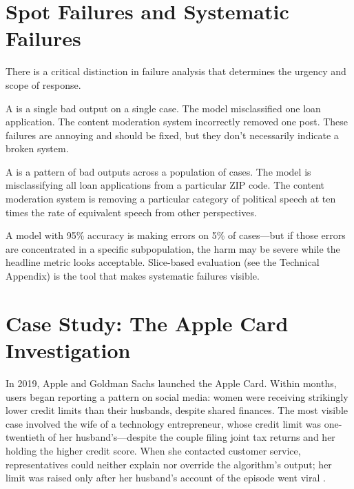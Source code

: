 \section{Spot Failures and Systematic Failures}
\label{sec:spot-vs-systematic}

There is a critical distinction in failure analysis that determines the urgency and scope of response.

A  is a single bad output on a single case. The model misclassified one loan application. The content moderation system incorrectly removed one post. These failures are annoying and should be fixed, but they don't necessarily indicate a broken system.

A  is a pattern of bad outputs across a population of cases. The model is misclassifying all loan applications from a particular ZIP code. The content moderation system is removing a particular category of political speech at ten times the rate of equivalent speech from other perspectives.

\begin{keyconcept}
A model with 95\% accuracy is making errors on 5\% of cases---but if those errors are concentrated in a specific subpopulation, the harm may be severe while the headline metric looks acceptable. Slice-based evaluation (see the Technical Appendix) is the tool that makes systematic failures visible.
\end{keyconcept}

\section{Case Study: The Apple Card Investigation}
\label{sec:credit-scoring}

In 2019, Apple and Goldman Sachs launched the Apple Card. Within months, users began reporting a pattern on social media: women were receiving strikingly lower credit limits than their husbands, despite shared finances. The most visible case involved the wife of a technology entrepreneur, whose credit limit was one-twentieth of her husband's---despite the couple filing joint tax returns and her holding the higher credit score. When she contacted customer service, representatives could neither explain nor override the algorithm's output; her limit was raised only after her husband's account of the episode went viral \autocite{nyt2019applecard}.

